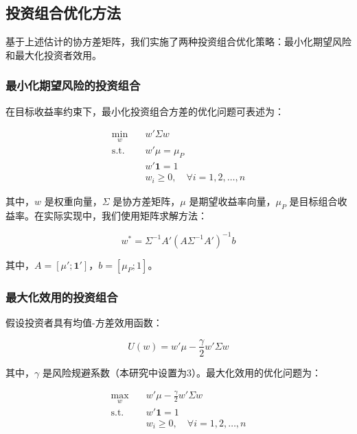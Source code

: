 \documentclass[12pt, a4paper]{article}
\begin{document}
\subsection{投资组合优化方法}
基于上述估计的协方差矩阵，我们实施了两种投资组合优化策略：最小化期望风险和最大化投资者效用。

\subsubsection{最小化期望风险的投资组合}
在目标收益率约束下，最小化投资组合方差的优化问题可表述为：

\begin{equation}
\begin{aligned}
\min_{w} \quad & w' \Sigma w \\
\text{s.t.} \quad & w' \mu = \mu_P \\
& w' \textbf{1} = 1 \\
& w_i \geq 0, \quad \forall i = 1, 2, \ldots, n
\end{aligned}
\end{equation}

其中，$w$ 是权重向量，$\Sigma$ 是协方差矩阵，$\mu$ 是期望收益率向量，$\mu_P$ 是目标组合收益率。在实际实现中，我们使用矩阵求解方法：

\begin{equation}
w^* = \Sigma^{-1} A' (A \Sigma^{-1} A')^{-1} b
\end{equation}

其中，$A = [\mu'; \textbf{1}']$，$b = [\mu_P; 1]$。

\subsubsection{最大化效用的投资组合}
假设投资者具有均值-方差效用函数：

\begin{equation}
U(w) = w' \mu - \frac{\gamma}{2} w' \Sigma w
\end{equation}

其中，$\gamma$ 是风险规避系数（本研究中设置为3）。最大化效用的优化问题为：

\begin{equation}
\begin{aligned}
\max_{w} \quad & w' \mu - \frac{\gamma}{2} w' \Sigma w \\
\text{s.t.} \quad & w' \textbf{1} = 1 \\
& w_i \geq 0, \quad \forall i = 1, 2, \ldots, n
\end{aligned}
\end{equation}
\end{document}
